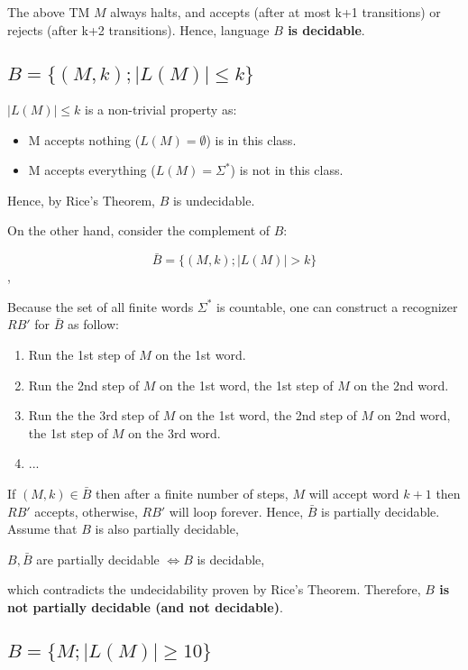 \documentclass{article}
\begin{document}
The above TM $M$ always halts, and accepts (after at most k+1 transitions) or rejects (after k+2 transitions). Hence, language \textbf{$B$ is decidable}.



\subsection{$B=\{(M,k); |L(M)| \le k\}$} \label{7.2}

$|L(M)| \le k$ is a non-trivial property as:
\begin{itemize}
    \item M accepts nothing ($L(M)=\emptyset$) is in this class.
    \item M accepts everything ($L(M)=\Sigma^*$) is not in this class.
\end{itemize}

Hence, by Rice's Theorem, $B$ is undecidable.

On the other hand, consider the complement of $B$:

\[\bar{B}=\{(M,k); |L(M)| > k\}\],

Because the set of all finite words $\Sigma^*$ is countable, one can construct a recognizer $RB'$ for $\bar{B}$ as follow:

\begin{enumerate}
    \item Run the 1st step of $M$ on the 1st word.
    \item Run the 2nd step of $M$ on the 1st word, the 1st step of $M$ on the 2nd word.
    \item Run the the 3rd step of $M$ on the 1st word, the 2nd step of $M$ on 2nd word, the 1st step of $M$ on the 3rd word.
    \item ...
\end{enumerate}

If $(M,k)\in \bar{B}$ then after a finite number of steps, $M$ will accept word $k+1$  then $RB'$ accepts, otherwise, $RB'$ will loop forever. Hence, $\bar{B}$ is partially decidable. Assume that $B$ is also partially decidable,

$B,\bar{B}$ are partially decidable $\Leftrightarrow B$ is decidable,

which contradicts the undecidability proven by Rice's Theorem. Therefore, \textbf{$B$ is not partially decidable (and not decidable)}.


\subsection{$B=\{M; |L(M)| \ge 10\}$}
\end{document}
